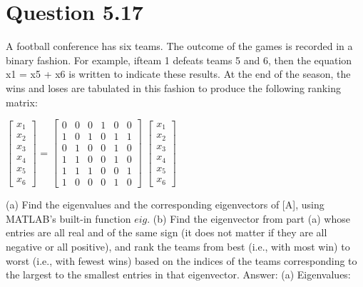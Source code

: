 \documentclass[12pt]{report}
\begin{document}
\section{Question 5.17}
A football conference has six teams. The outcome of the games is recorded in a binary fashion. For example, ifteam 1 defeats teams 5 and 6, then the equation x1 = x5 + x6 is written to indicate these results. At the end of the season, the wins and loses are tabulated in this fashion to produce the following ranking matrix: 
\begin{center}
$\begin{bmatrix}
{x_1}\\
{x_2}\\
{x_3}\\
{x_4}\\
{x_5}\\
{x_6}
\end{bmatrix}$ 
=
$\begin{bmatrix}
{0} & {0} & {0} & {1} &{0} &{0}\\
{1} & {0} & {1} & {0} &{1} &{1}\\
{0} & {1} & {0} & {0} &{1} &{0}\\
{1} & {1} & {0} & {0} &{1} &{0}\\
{1} & {1} & {1} & {0} &{0} &{1}\\
{1} & {0} & {0} & {0} &{1} &{0}
\end{bmatrix}$ 
$\begin{bmatrix}
{x_1}\\
{x_2}\\
{x_3}\\
{x_4}\\
{x_5}\\
{x_6}
\end{bmatrix}$ 
\end{center}
(a) Find the eigenvalues and the  corresponding eigenvectors of [A], using MATLAB's built-in function $eig$. 
\newline
\newline
(b) Find the eigenvector from part (a) whose entries are all real and of the same sign (it does not matter if they are all negative or all positive), and rank the teams from best (i.e., with most win) to worst (i.e., with fewest wins) based on the indices of the teams corresponding to the largest to the smallest entries in that eigenvector. 
\newline
\newline
Answer:
\newline
(a) Eigenvalues: 
\newline
\end{document}
